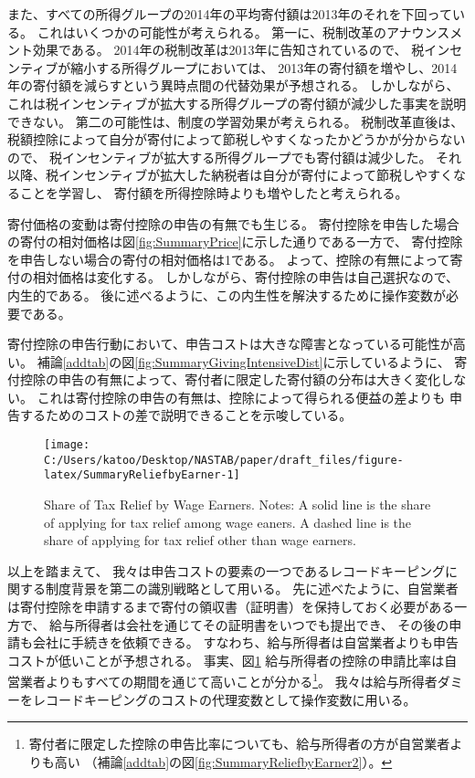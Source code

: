 \documentclass[
  11pt,
  a4paper,
]{article}
\begin{document}
また、すべての所得グループの2014年の平均寄付額は2013年のそれを下回っている。
これはいくつかの可能性が考えられる。
第一に、税制改革のアナウンスメント効果である。
2014年の税制改革は2013年に告知されているので、
税インセンティブが縮小する所得グループにおいては、
2013年の寄付額を増やし、2014年の寄付額を減らすという異時点間の代替効果が予想される。
しかしながら、これは税インセンティブが拡大する所得グループの寄付額が減少した事実を説明できない。
第二の可能性は、制度の学習効果が考えられる。
税制改革直後は、税額控除によって自分が寄付によって節税しやすくなったかどうかが分からないので、
税インセンティブが拡大する所得グループでも寄付額は減少した。
それ以降、税インセンティブが拡大した納税者は自分が寄付によって節税しやすくなることを学習し、
寄付額を所得控除時よりも増やしたと考えられる。

寄付価格の変動は寄付控除の申告の有無でも生じる。
寄付控除を申告した場合の寄付の相対価格は図\ref{fig:SummaryPrice}に示した通りである一方で、
寄付控除を申告しない場合の寄付の相対価格は1である。
よって、控除の有無によって寄付の相対価格は変化する。
しかしながら、寄付控除の申告は自己選択なので、内生的である。
後に述べるように、この内生性を解決するために操作変数が必要である。

寄付控除の申告行動において、申告コストは大きな障害となっている可能性が高い。
補論\ref{addtab}の図\ref{fig:SummaryGivingIntensiveDist}に示しているように、
寄付控除の申告の有無によって、寄付者に限定した寄付額の分布は大きく変化しない。
これは寄付控除の申告の有無は、控除によって得られる便益の差よりも
申告するためのコストの差で説明できることを示唆している。

\begin{figure}[t]

{\centering \texttt{[image: C:/Users/katoo/Desktop/NASTAB/paper/draft\_files/figure-latex/SummaryReliefbyEarner-1]} 

}

\caption{Share of Tax Relief by Wage Earners. Notes: A solid line is the share of applying for tax relief among wage eaners. A dashed line is the share of applying for tax relief other than wage earners.}\label{fig:SummaryReliefbyEarner}
\end{figure}

以上を踏まえて、
我々は申告コストの要素の一つであるレコードキーピングに関する制度背景を第二の識別戦略として用いる。
先に述べたように、自営業者は寄付控除を申請するまで寄付の領収書（証明書）を保持しておく必要がある一方で、
給与所得者は会社を通じてその証明書をいつでも提出でき、
その後の申請も会社に手続きを依頼できる。
すなわち、給与所得者は自営業者よりも申告コストが低いことが予想される。
事実、図\ref{fig:SummaryReliefbyEarner}
給与所得者の控除の申請比率は自営業者よりもすべての期間を通じて高いことが分かる\footnote{寄付者に限定した控除の申告比率についても、給与所得者の方が自営業者よりも高い
  （補論\ref{addtab}の図\ref{fig:SummaryReliefbyEarner2}）。}。
我々は給与所得者ダミーをレコードキーピングのコストの代理変数として操作変数に用いる。
\end{document}
